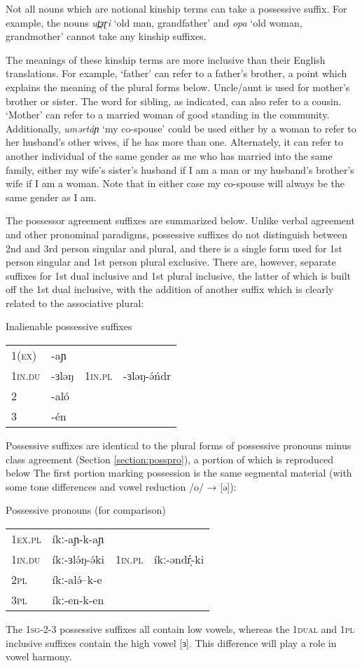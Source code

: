 Not all nouns which are notional kinship terms can take a possessive suffix. For example, the nouns \textit{ut̪ɜɽi} `old man, grandfather' and \textit{opa} `old woman, grandmother' cannot take any kinship suffixes.

The meanings of these kinship terms are more inclusive than their English translations. For example, `father’ can refer to a father’s brother, a point which explains the meaning of the plural forms below. Uncle/aunt is used for mother’s brother or sister. The word for sibling, as indicated, can also refer to a cousin. `Mother’ can refer to a married woman of good standing in the community. Additionally, \textit{umərtáɲ} `my co-spouse' could be used either by a woman to refer to her husband's other wives, if he has more than one. Alternately, it can refer to another individual of the  same gender as me who has married into the same family, either my wife's sister's husband if I am a man or my husband's brother's wife if I am a woman. Note that in either case my co-spouse will always be the same gender as I am.

The possessor agreement suffixes are summarized below. Unlike verbal agreement and other pronominal paradigms, possessive suffixes do not distinguish between 2nd and 3rd person singular and plural, and there is a single form used for 1st person singular and 1st person plural exclusive. There are, however, separate suffixes for 1st dual inclusive and 1st plural inclusive, the latter of which is built off the 1st dual inclusive, with the addition of another suffix which is clearly related to the associative plural:

\ea Inalienable possessive suffixes\\
\begin{tabular}[t]{llll}
1(\textsc{ex}) &	-aɲ	&	& 	\\
1\textsc{in.du}	& -ɜləŋ	&  1\textsc{in.pl}	&  -ɜləŋ-ə́ńdr\\
2	& -aló	& & 	\\
3	&  -én & & \\
\end{tabular}
\z
Possessive suffixes are identical to the plural forms of possessive pronouns minus class agreement (Section \ref{section:posspro}), a portion of which is reproduced below The first portion marking possession is the same segmental material (with some tone differences and vowel reduction /o/ → [ə]):

\ea Possessive pronouns (for comparison)\\
\begin{tabular}[t]{llll}
1\textsc{ex.pl}	 & íkː-aɲ-k-aɲ & & \\
1\textsc{in.du} &	íkː-ɜlə́ŋ-ə́ki & 1\textsc{in.pl} &	íkː-əndŕ̩-ki\\
2\textsc{pl} & 	íkː-alə́--k-e	&  & \\
3\textsc{pl}	& íkː-en-k-en & & \\
\end{tabular}
\z 
The 1\textsc{sg}-2-3 possessive suffixes all contain low vowels, whereas the 1\textsc{dual} and 1\textsc{pl} inclusive suffixes contain the high vowel [ɜ]. This difference will play a role in vowel harmony.

